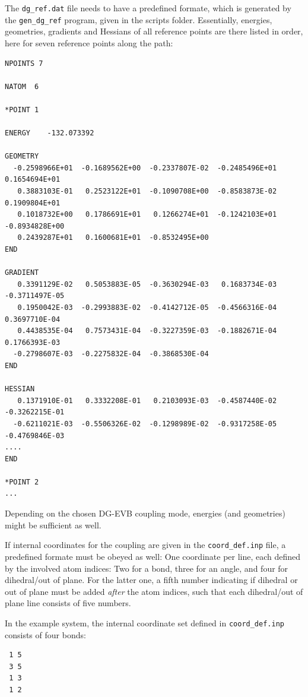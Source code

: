 \documentclass[12pt,a4paper]{scrartcl}
\begin{document}
The \texttt{dg\_ref.dat} file needs to have a predefined formate, which is generated by the 
\texttt{gen\_dg\_ref} program, given in the scripts folder. 
Essentially, energies, geometries, gradients and Hessians of all reference points are there 
listed in order, here for seven reference points along the path:

\begin{verbatim}
NPOINTS 7

NATOM  6

*POINT 1

ENERGY    -132.073392

GEOMETRY
  -0.2598966E+01  -0.1689562E+00  -0.2337807E-02  -0.2485496E+01   0.1654694E+01
   0.3883103E-01   0.2523122E+01  -0.1090708E+00  -0.8583873E-02   0.1909804E+01
   0.1018732E+00   0.1786691E+01   0.1266274E+01  -0.1242103E+01  -0.8934828E+00
   0.2439287E+01   0.1600681E+01  -0.8532495E+00
END

GRADIENT
   0.3391129E-02   0.5053883E-05  -0.3630294E-03   0.1683734E-03  -0.3711497E-05
   0.1950042E-03  -0.2993883E-02  -0.4142712E-05  -0.4566316E-04   0.3697710E-04
   0.4438535E-04   0.7573431E-04  -0.3227359E-03  -0.1882671E-04   0.1766393E-03
  -0.2798607E-03  -0.2275832E-04  -0.3868530E-04
END

HESSIAN
   0.1371910E-01   0.3332208E-01   0.2103093E-03  -0.4587440E-02  -0.3262215E-01
  -0.6211021E-03  -0.5506326E-02  -0.1298989E-02  -0.9317258E-05  -0.4769846E-03
....
END

*POINT 2
...
\end{verbatim}

Depending on the chosen DG-EVB coupling mode, energies (and geometries) might be sufficient 
as well.

If internal coordinates for the coupling are given in the \texttt{coord\_def.inp} file, a 
predefined formate must be obeyed as well:
One coordinate per line, each defined by the involved atom indices: Two for a bond,
three for an angle, and four for dihedral/out of plane. For the latter one, a fifth 
number indicating if dihedral or out of plane must be added \textit{after} the atom 
indices, such that each dihedral/out of plane line consists of five numbers.
 
In the example system, the internal coordinate set defined in \texttt{coord\_def.inp} 
consists of four bonds:

\begin{verbatim}
 1 5
 3 5
 1 3
 1 2
\end{verbatim}
\end{document}
